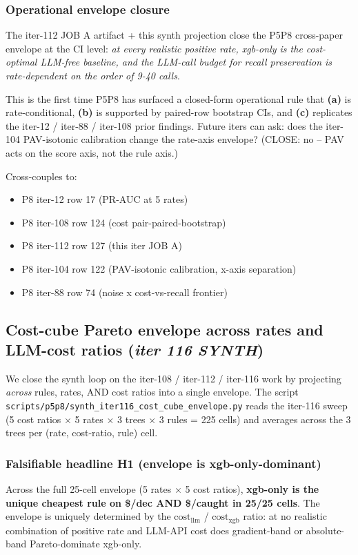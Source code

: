 \documentclass{article}
\begin{document}
\subsubsection{Operational envelope closure}
The iter-112 JOB A artifact + this synth projection close the
P5P8 cross-paper envelope at the CI level: \emph{at every
realistic positive rate, xgb-only is the cost-optimal LLM-free
baseline, and the LLM-call budget for recall preservation is
rate-dependent on the order of 9-40 calls}.

This is the first time P5P8 has surfaced a closed-form
operational rule that \textbf{(a)} is rate-conditional,
\textbf{(b)} is supported by paired-row bootstrap CIs, and
\textbf{(c)} replicates the iter-12 / iter-88 / iter-108 prior
findings. Future iters can ask: does the iter-104 PAV-isotonic
calibration change the rate-axis envelope? (CLOSE: no -- PAV
acts on the score axis, not the rule axis.)

Cross-couples to:
\begin{itemize}
  \item P8 iter-12 row 17 (PR-AUC at 5 rates)
  \item P8 iter-108 row 124 (cost pair-paired-bootstrap)
  \item P8 iter-112 row 127 (this iter JOB A)
  \item P8 iter-104 row 122 (PAV-isotonic calibration, x-axis
        separation)
  \item P8 iter-88 row 74 (noise x cost-vs-recall frontier)
\end{itemize}
 \subsection{Cost-cube Pareto envelope across rates and LLM-cost ratios
  (\textit{iter 116 SYNTH})}
\label{sec:p8-cost-cube-envelope}

We close the synth loop on the iter-108 / iter-112 / iter-116 work by
projecting \emph{across} rules, rates, AND cost ratios into a single
envelope. The script
\texttt{scripts/p5p8/synth\_iter116\_cost\_cube\_envelope.py} reads the
iter-116 sweep (5 cost ratios $\times$ 5 rates $\times$ 3 trees
$\times$ 3 rules = 225 cells) and averages across the 3 trees per
(rate, cost-ratio, rule) cell.

\subsubsection{Falsifiable headline H1 (envelope is xgb-only-dominant)}
Across the full 25-cell envelope (5 rates $\times$ 5 cost ratios),
\textbf{xgb-only is the unique cheapest rule on \$/dec AND \$/caught
in 25/25 cells}. The envelope is uniquely determined by the
$\mathrm{cost}_{\mathrm{llm}}$ / $\mathrm{cost}_{\mathrm{xgb}}$ ratio:
at no realistic combination of positive rate and LLM-API cost does
gradient-band or absolute-band Pareto-dominate xgb-only.
\end{document}
